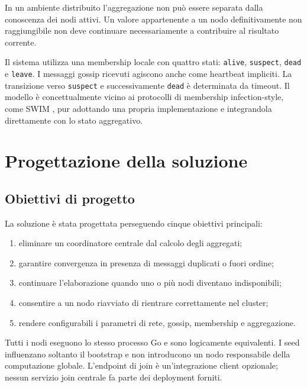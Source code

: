 \documentclass[conference]{IEEEtran}
\begin{document}
In un ambiente distribuito l'aggregazione non può essere separata dalla conoscenza dei nodi attivi. Un valore appartenente a un nodo definitivamente non raggiungibile non deve continuare necessariamente a contribuire al risultato corrente.

Il sistema utilizza una membership locale con quattro stati: \texttt{alive}, \texttt{suspect}, \texttt{dead} e \texttt{leave}. I messaggi gossip ricevuti agiscono anche come heartbeat impliciti. La transizione verso \texttt{suspect} e successivamente \texttt{dead} è determinata da timeout. Il modello è concettualmente vicino ai protocolli di membership infection-style, come SWIM \cite{das2002}, pur adottando una propria implementazione e integrandola direttamente con lo stato aggregativo.

\section{Progettazione della soluzione}

\subsection{Obiettivi di progetto}

La soluzione è stata progettata perseguendo cinque obiettivi principali:

\begin{enumerate}
    \item eliminare un coordinatore centrale dal calcolo degli aggregati;
    \item garantire convergenza in presenza di messaggi duplicati o fuori ordine;
    \item continuare l'elaborazione quando uno o più nodi diventano indisponibili;
    \item consentire a un nodo riavviato di rientrare correttamente nel cluster;
    \item rendere configurabili i parametri di rete, gossip, membership e aggregazione.
\end{enumerate}

Tutti i nodi eseguono lo stesso processo Go e sono logicamente equivalenti. I seed influenzano soltanto il bootstrap e non introducono un nodo responsabile della computazione globale. L'endpoint di join è un'integrazione client opzionale; nessun servizio join centrale fa parte dei deployment forniti.
\end{document}
